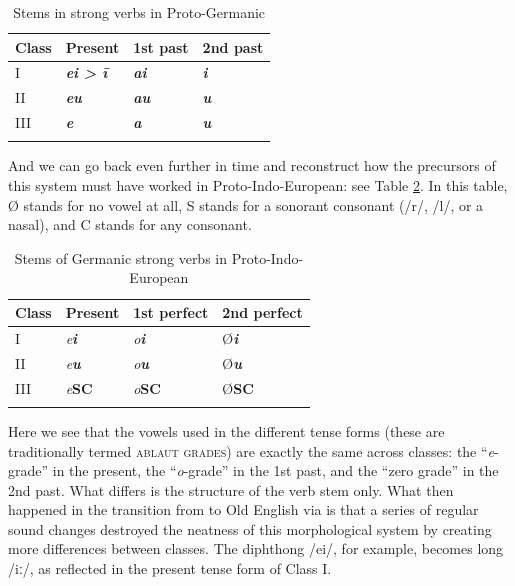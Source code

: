 \begin{table}
    \begin{tabularx}{\textwidth}{XXXl}
        \midrule
    \textbf{Class} & \textbf{Present} & \textbf{1st past} & \textbf{2nd past}\\
    \midrule
    I & \emph{\textbf{ei > ī}} & \emph{\textbf{ai}} & \emph{\textbf{i}} \\
    II & \emph{\textbf{eu}} & \emph{\textbf{au}} & \emph{\textbf{u}} \\
    III & \emph{\textbf{e}} & \emph{\textbf{a}} & 
    \emph{\textbf{u}} \\
    \lspbottomrule
    \end{tabularx}
    \caption{Stems in strong verbs in Proto-Germanic}
    \label{tab:PGmc-strong-verbs-stems}
\end{table}

\noindent And we can go back even further in time and reconstruct how the precursors of this system must have worked in Proto-Indo-European: see Table \ref{tab:PIE-strong-verbs-stems}. In this table, Ø stands for no vowel at all, S stands for a sonorant consonant (/r/, /l/, or a nasal), and C stands for any consonant.

\begin{table}
    \begin{tabularx}{\textwidth}{XXXl}
        \lsptoprule
    \textbf{Class} & \textbf{Present} & \textbf{1st perfect} & \textbf{2nd perfect}\\
    \midrule
    I & \emph{e\textbf{i}} & \emph{o\textbf{i}} & Ø\emph{\textbf{i}} \\
    II & \emph{e\textbf{u}} & \emph{o\textbf{u}} & Ø\emph{\textbf{u}} \\
    III & \emph{e}\textbf{SC} & \emph{o}\textbf{SC} & Ø\textbf{SC} \\
    \lspbottomrule
    \end{tabularx}
    \caption{Stems of Germanic strong verbs in Proto-Indo-European}
    \label{tab:PIE-strong-verbs-stems}
\end{table}

Here we see that the vowels used in the different tense forms (these are traditionally termed \textsc{ablaut grades}) are exactly the same across classes: the ``\emph{e}-grade'' in the present, the ``\emph{o}-grade'' in the 1st past, and the ``zero grade'' in the 2nd past. What differs is the structure of the verb stem only. What then happened in the transition from  to Old English via  is that a series of regular sound changes destroyed the neatness of this morphological system by creating more differences between classes. The diphthong /ei/, for example, becomes long /iː/, as reflected in the present tense form of Class I.

